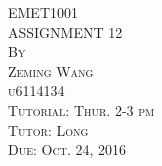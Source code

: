\documentclass{article}
\begin{document}




\thispagestyle{empty}

\begin{center}
\huge
\vspace*{1.0in} EMET1001 
\\\vspace{0.5in} ASSIGNMENT 12
\normalsize
\\\vspace{0.5in} \textsc{By}
\\\vspace{0.1in} \textsc{Zeming Wang}
\\\vspace{0.1in} \textsc{u6114134}
\normalsize
\\\vspace{0.5in} \textsc{Tutorial: Thur. 2-3 pm}
\\\vspace{0.1in} \textsc{Tutor: Long}
\normalsize
\\\vspace{0.5in} \textsc{Due: Oct. 24, 2016}
\end{center}

\newpage
\setcounter{page}{1}
\end{document}
